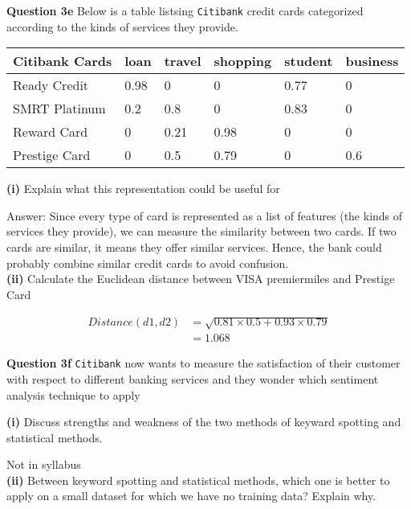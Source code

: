 \documentclass[11pt,a4paper]{report}
\begin{document}
\begin{multicols*}{2}
\noindent \textbf{Question 3e} Below is a table listsing \verb|Citibank| credit cards categorized according to the kinds of services they provide.

\tiny
\begin{center}
\begin{tabular}{|l | l | l | l | l | l |}
    \hline
    Citibank Cards & loan & travel & shopping & student & business \\
    \hline
    Ready Credit   & 0.98 & 0      & 0        & 0.77    & 0 \\
    SMRT Platinum  & 0.2  & 0.8    & 0        & 0.83    & 0 \\
    Reward Card    & 0    & 0.21   & 0.98     & 0       & 0 \\
    Prestige Card  & 0    & 0.5    & 0.79     & 0       & 0.6\\
    \hline
\end{tabular}
\end{center}
\normalsize

\noindent \textbf{(i)} Explain what this representation could be useful for

\noindent Answer: Since every type of card is represented as a list of features (the kinds of services they provide), we can measure the similarity between two cards. If two cards are similar, it means they offer similar services. Hence, the bank could probably combine similar credit cards to avoid confusion. \\

\noindent \textbf{(ii)} Calculate the Euclidean distance between VISA premiermiles and Prestige Card

\begin{equation*}
\begin{split}
    Distance(d1,d2) &= \sqrt{0.81 \times 0.5 + 0.93 \times 0.79}\\
    &= 1.068
\end{split}
\end{equation*}

\noindent \textbf{Question 3f} \verb|Citibank| now wants to measure the satisfaction of their customer with respect to different banking services and they wonder which sentiment analysis technique to apply

\noindent \textbf{(i)} Discuss strengths and weakness of the two methods of keyward spotting and statistical methods. 

\noindent Not in syllabus\\

\noindent \textbf{(ii)} Between keyword spotting and statistical methods, which one is better to apply on a small dataset for which we have no training data? Explain why.


\end{multicols*}
\end{document}
